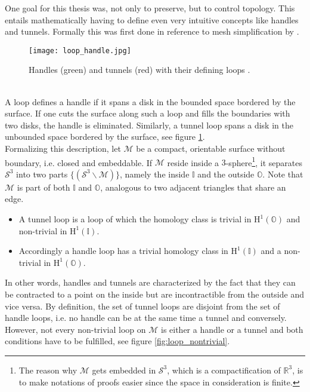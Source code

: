 One goal for this thesis was, not only to preserve, but to control topology.
This entails mathematically having to define even very intuitive concepts like handles and tunnels.
Formally this was first done in reference to mesh simplification by \citep[][]{Dey2007}.
\begin{figure}[htb]
\centering
\texttt{[image: loop\_handle.jpg]}
\caption{Handles (green) and tunnels (red) with their defining loops \citep[][]{Dey2012}.}
\label{fig:loop_handle}
\end{figure}\\
A loop defines a handle if it spans a disk in the bounded space bordered by the surface.
If one cuts the surface along such a loop and fills the boundaries with two disks, the handle is eliminated.
Similarly, a tunnel loop spans a disk in the unbounded space bordered by the surface, see figure \ref{fig:loop_handle}.\\
Formalizing this description, let $\mathcal{M}$ be a compact, orientable surface without boundary, i.e. closed and embeddable.
If $\mathcal{M}$ reside inside a $3$-sphere\footnote{ The reason why $\mathcal{M}$ gets embedded in $\mathcal{S}^{3}$, which is a compactification of $\mathbb{R}^{3}$, is to make notations of proofs easier since the space in consideration is finite.}, it separates $\mathcal{S}^{3}$ into two parts $\{(\mathcal{S}^{3} \backslash \mathcal{M})\}$, namely the inside $\mathbb{I}$ and the outside $\mathbb{O}$.
Note that $\mathcal{M}$ is part of both $\mathbb{I}$ and $\mathbb{O}$, analogous to two adjacent triangles that share an edge.
\begin{itemize}
\setlength{\itemsep}{0cm}
\setlength{\parskip}{0cm}
	\item A tunnel loop is a loop of which the homology class is trivial in $\mathrm{H}^{1}(\mathbb{O})$ and non-trivial in $\mathrm{H}^{1}(\mathbb{I})$.
	\item Accordingly a handle loop has a trivial homology class in $\mathrm{H}^{1}(\mathbb{I})$ and a non-trivial in $\mathrm{H}^{1}(\mathbb{O})$.
\end{itemize}

In other words, handles and tunnels are characterized by the fact that they can be contracted to a point on the inside but are incontractible from the outside and vice versa.
By definition, the set of tunnel loops are disjoint from the set of handle loops, i.e. no handle can be at the same time a tunnel and conversely.
However, not every non-trivial loop on $\mathcal{M}$ is either a handle or a tunnel and both conditions have to be fulfilled, see figure \ref{fig:loop_nontrivial}.

